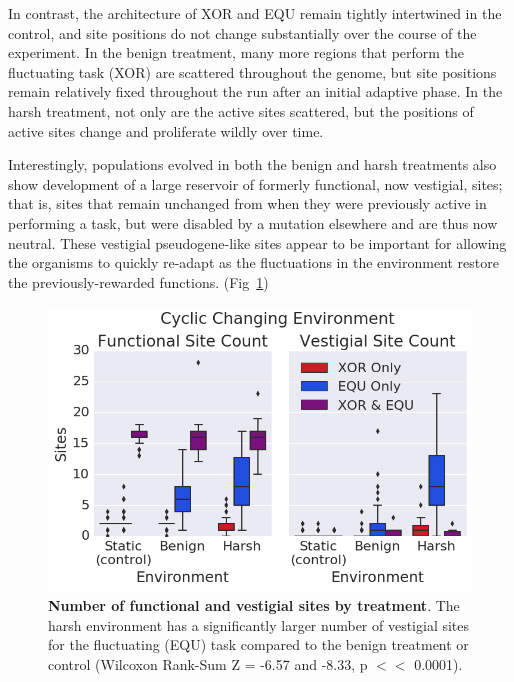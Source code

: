 \documentclass[PhD]{msu-thesis}
\begin{document}
In contrast, the architecture of XOR and EQU remain tightly intertwined in the control, and site positions do not change substantially over the course of the experiment. In the benign treatment, many more regions that perform the fluctuating task (XOR) are scattered throughout the genome, but site positions remain relatively fixed throughout the run after an initial adaptive phase. In the harsh treatment, not only are the active sites scattered, but the positions of active sites change and proliferate wildly over time.

Interestingly, populations evolved in both the benign and harsh treatments also show development of a large reservoir of formerly functional, now vestigial, sites; that is, sites that remain unchanged from when they were previously active in performing a task, but were disabled by a mutation elsewhere and are thus now neutral. These vestigial pseudogene-like sites appear to be important for allowing the organisms to quickly re-adapt as the fluctuations in the environment restore the previously-rewarded functions. (Fig~\ref{fig:CCE_func_vestigial})

	\begin{figure}[!h]
	\includegraphics[trim={0 0 0 0}, clip, width=0.75\columnwidth]{figures/CE/CCE_func_vest__box.png}
	\caption{\textbf{Number of functional and vestigial sites by treatment}. The harsh environment has a significantly larger number of vestigial sites for the fluctuating (EQU) task compared to the benign treatment or control (Wilcoxon Rank-Sum Z = -6.57 and -8.33, p $<<$ 0.0001).
	}
	\label{fig:CCE_func_vestigial} %
	\end{figure}
\end{document}
